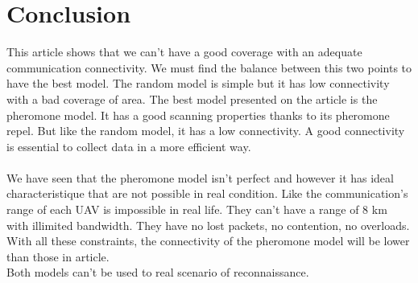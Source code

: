\chapter{Conclusion}

This article shows that we can't have a good coverage with an adequate communication connectivity. We must find the balance between this two points to have the best model. The random model is simple but it has low connectivity with a bad coverage of area. The best model presented on the article is the pheromone model. It has a good scanning properties thanks to its pheromone repel. But like the random model, it has a low connectivity. A good connectivity is essential to collect data in a more efficient way.\\\\

We have seen that the pheromone model isn't perfect and however it has ideal characteristique that are not possible in real condition. Like the communication's range of each UAV is impossible in real life. They can't have a range of 8 km with illimited bandwidth. They have no lost packets,  no contention, no overloads. With all these constraints, the connectivity of the pheromone model will be lower than those in article.\\
Both models can't be used to real scenario of reconnaissance.